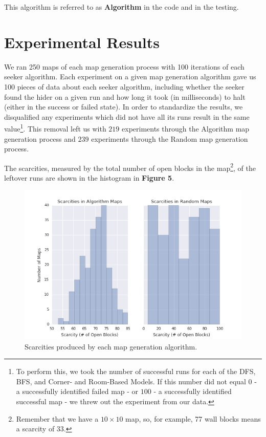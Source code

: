 \documentclass[12pt]{article}
\begin{document}
This algorithm is referred to as \textbf{Algorithm} in the code and in the testing.

\section{Experimental Results}
We ran 250 maps of each map generation process with 100 iterations of each seeker algorithm. Each experiment on a given map generation algorithm gave us 100 pieces of data about each seeker algorithm, including whether the seeker found the hider on a given run and how long it took (in milliseconds) to halt (either in the success or failed state). In order to standardize the results, we disqualified any experiments which did not have all its runs result in the same value\footnote{To perform this, we took the number of successful runs for each of the DFS, BFS, and Corner- and Room-Based Models. If this number did not equal $ 0 $ - a successfully identified failed map - or $ 100 $ - a successfully identified successful map - we threw out the experiment from our data.}. This removal left us with $ 219 $ experiments through the Algorithm map generation process and $ 239 $ experiments through the Random map generation process.

The scarcities, measured by the total number of open blocks in the map\footnote{Remember that we have a $ 10 \times 10 $ map, so, for example, 77 wall blocks means a scarcity of $ 33 $.}, of the leftover runs are shown in the histogram in \textbf{Figure 5}.

\begin{figure}[htbp]
\includegraphics[width=1\linewidth]{Scarcity.png} 
\caption{Scarcities produced by each map generation algorithm.}
\end{figure} 
\end{document}
